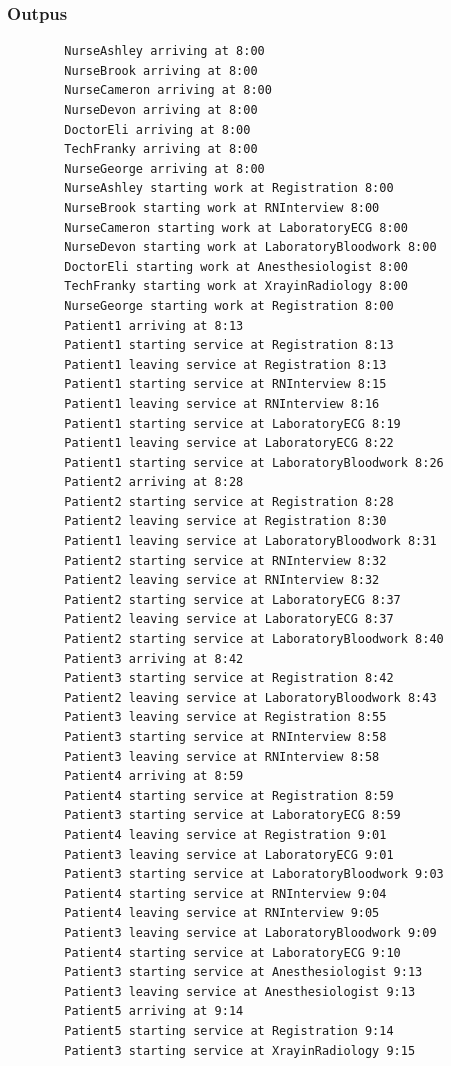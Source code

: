 \documentclass[12pt]{article}
\begin{document}
		\subsubsection{Outpus}
		\begin{verbatim}
		NurseAshley arriving at 8:00
		NurseBrook arriving at 8:00
		NurseCameron arriving at 8:00
		NurseDevon arriving at 8:00
		DoctorEli arriving at 8:00
		TechFranky arriving at 8:00
		NurseGeorge arriving at 8:00
		NurseAshley starting work at Registration 8:00
		NurseBrook starting work at RNInterview 8:00
		NurseCameron starting work at LaboratoryECG 8:00
		NurseDevon starting work at LaboratoryBloodwork 8:00
		DoctorEli starting work at Anesthesiologist 8:00
		TechFranky starting work at XrayinRadiology 8:00
		NurseGeorge starting work at Registration 8:00
		Patient1 arriving at 8:13
		Patient1 starting service at Registration 8:13
		Patient1 leaving service at Registration 8:13
		Patient1 starting service at RNInterview 8:15
		Patient1 leaving service at RNInterview 8:16
		Patient1 starting service at LaboratoryECG 8:19
		Patient1 leaving service at LaboratoryECG 8:22
		Patient1 starting service at LaboratoryBloodwork 8:26
		Patient2 arriving at 8:28
		Patient2 starting service at Registration 8:28
		Patient2 leaving service at Registration 8:30
		Patient1 leaving service at LaboratoryBloodwork 8:31
		Patient2 starting service at RNInterview 8:32
		Patient2 leaving service at RNInterview 8:32
		Patient2 starting service at LaboratoryECG 8:37
		Patient2 leaving service at LaboratoryECG 8:37
		Patient2 starting service at LaboratoryBloodwork 8:40
		Patient3 arriving at 8:42
		Patient3 starting service at Registration 8:42
		Patient2 leaving service at LaboratoryBloodwork 8:43
		Patient3 leaving service at Registration 8:55
		Patient3 starting service at RNInterview 8:58
		Patient3 leaving service at RNInterview 8:58
		Patient4 arriving at 8:59
		Patient4 starting service at Registration 8:59
		Patient3 starting service at LaboratoryECG 8:59
		Patient4 leaving service at Registration 9:01
		Patient3 leaving service at LaboratoryECG 9:01
		Patient3 starting service at LaboratoryBloodwork 9:03
		Patient4 starting service at RNInterview 9:04
		Patient4 leaving service at RNInterview 9:05
		Patient3 leaving service at LaboratoryBloodwork 9:09
		Patient4 starting service at LaboratoryECG 9:10
		Patient3 starting service at Anesthesiologist 9:13
		Patient3 leaving service at Anesthesiologist 9:13
		Patient5 arriving at 9:14
		Patient5 starting service at Registration 9:14
		Patient3 starting service at XrayinRadiology 9:15

\end{verbatim}
\end{document}
